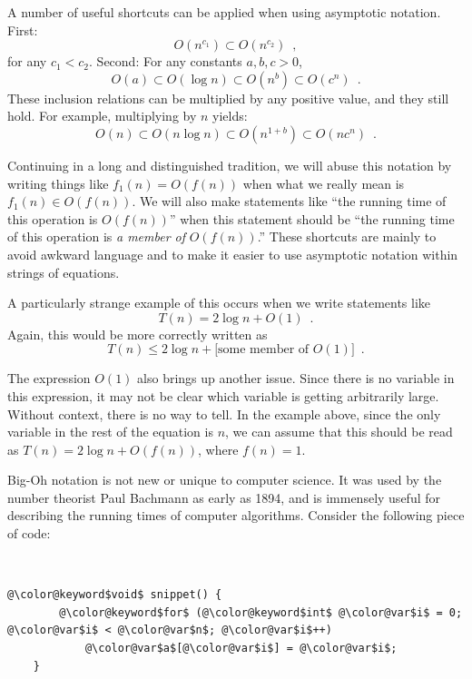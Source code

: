 \documentclass[10pt]{book}
\theoremstyle{plain}
\theoremstyle{definition}
\begin{document}
A number of useful shortcuts can be applied when using asymptotic
notation.  First:
\[ O(n^{c_1}) \subset O(n^{c_2}) \enspace ,\]
for any $c_1 < c_2$.  Second: For any constants $a,b,c > 0$,
\[ O(a) \subset O(\log n) \subset O(n^{b}) \subset O({c}^n) \enspace . \]
These inclusion relations can be multiplied by any positive value,
and they still hold. For example, multiplying by $n$ yields:
\[ O(n) \subset O(n\log n) \subset O(n^{1+b}) \subset O(n{c}^n) \enspace . \]

Continuing in a long and distinguished tradition, we will abuse this
notation by writing things like $f_1(n) = O(f(n))$ when what we really
mean is $f_1(n) \in O(f(n))$.  We will also make statements like ``the
running time of this operation is $O(f(n))$'' when this statement should
be ``the running time of this operation is \emph{a member of} $O(f(n))$.''
These shortcuts are mainly to avoid awkward language and to make it
easier to use asymptotic notation within strings of equations.

A particularly strange example of this occurs when we write statements like
\[
  T(n) = 2\log n + O(1)  \enspace .
\]
Again, this would be more correctly written as
\[
  T(n) \le 2\log n + [\mbox{some member of $O(1)$]}  \enspace .
\]

The expression $O(1)$ also brings up another issue. Since there is
no variable in this expression, it may not be clear which variable is
getting arbitrarily large.  Without context, there is no way to tell.
In the example above, since the only variable in the rest of the equation
is $n$, we can assume that this should be read as $T(n) = 2\log n +
O(f(n))$, where $f(n) = 1$.

Big-Oh notation is not new or unique to computer science.  It was
used by the number theorist Paul Bachmann as early as 1894, and is
immensely useful for describing the running times of computer algorithms.
Consider the following piece of code:


 \ \vspace{.5ex}\begin{Verbatim}[gobble=1,tabsize=2,frame=single,framerule=1.2pt,commandchars=\\@\$,label=\texttt{Simple},labelposition=topline]
	@\color@keyword$void$ snippet() {
		@\color@keyword$for$ (@\color@keyword$int$ @\color@var$i$ = 0; @\color@var$i$ < @\color@var$n$; @\color@var$i$++) 
			@\color@var$a$[@\color@var$i$] = @\color@var$i$;
	}
\end{Verbatim}
\end{document}
